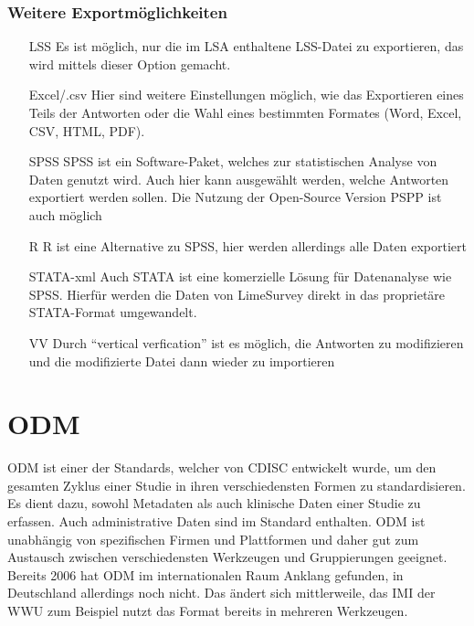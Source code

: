 \subsubsection{Weitere Exportmöglichkeiten}
\begin{itemize}
	\item[LSS] Es ist möglich, nur die im LSA enthaltene LSS-Datei zu exportieren, das wird mittels dieser Option gemacht.
	\item[Excel/.csv] Hier sind weitere Einstellungen möglich, wie das Exportieren eines Teils der Antworten oder die Wahl eines bestimmten Formates (Word, Excel, CSV, HTML, PDF).
	\item[SPSS] SPSS ist ein Software-Paket, welches zur statistischen Analyse von Daten genutzt wird. Auch hier kann ausgewählt werden, welche Antworten exportiert werden sollen. Die Nutzung der Open-Source Version PSPP ist auch möglich
	\item[R] R ist eine Alternative zu SPSS, hier werden allerdings alle Daten exportiert
	\item[STATA-xml] Auch STATA ist eine komerzielle Lösung für Datenanalyse wie SPSS. Hierfür werden die Daten von LimeSurvey direkt in das proprietäre STATA-Format umgewandelt.
	\item[VV] Durch \enquote{vertical verfication} ist es möglich, die Antworten zu modifizieren und die modifizierte Datei dann wieder zu importieren
\end{itemize}

\section{ODM}
\label{m:odm}


ODM ist einer der Standards, welcher von CDISC entwickelt wurde, um den gesamten Zyklus einer Studie in ihren verschiedensten Formen zu standardisieren.
Es dient dazu, sowohl Metadaten als auch klinische Daten einer Studie zu erfassen. Auch administrative Daten sind im Standard enthalten.
ODM ist unabhängig von spezifischen Firmen und Plattformen und daher gut zum Austausch zwischen verschiedensten Werkzeugen und Gruppierungen geeignet.
Bereits 2006 hat ODM im internationalen Raum Anklang gefunden, in Deutschland allerdings noch nicht.
Das ändert sich mittlerweile, das IMI der WWU zum Beispiel nutzt das Format bereits in mehreren Werkzeugen.

